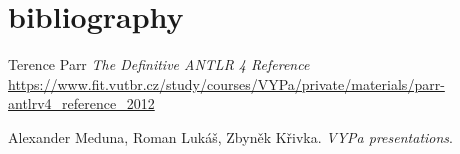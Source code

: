 \documentclass[a4paper,11pt]{article}
\begin{document}
    \section{bibliography}
        \begin{bibliography}{}
            Terence Parr
            \textit{The Definitive ANTLR 4 Reference}
            \url{https://www.fit.vutbr.cz/study/courses/VYPa/private/materials/parr-antlrv4_reference_2012}

            Alexander Meduna, Roman Lukáš, Zbyněk Křivka.
            \textit{VYPa presentations}.
        \end{bibliography}
\end{document}
